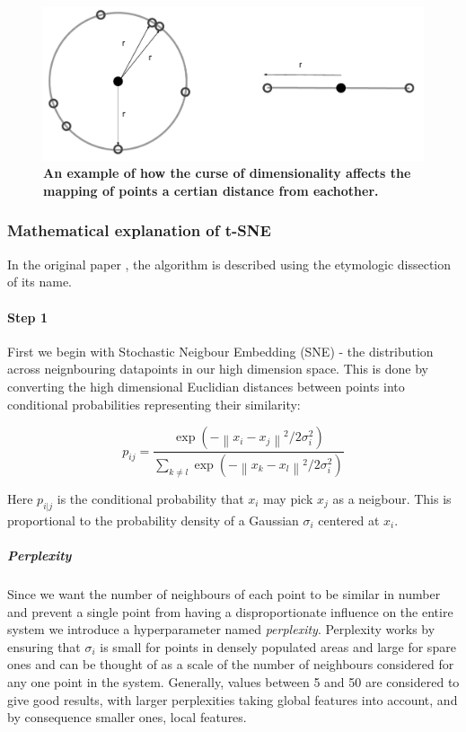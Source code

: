 \begin{figure}[H]
  \centering
\includegraphics[width=.5\textwidth]{4fig/dimcurse.pdf}
\caption{\textbf{An example of how the curse of dimensionality affects the mapping of points a certian distance from eachother.} }\label{fig:dimcurse}
\end{figure}




\subsubsection{Mathematical explanation of t-SNE}\label{sec:mathtsne}

%

In the original paper \citep{tsne}, the algorithm is described using the etymologic dissection of its name.

\paragraph{Step 1}
First we begin with Stochastic Neigbour Embedding (SNE) - the distribution across neignbouring datapoints in our high dimension space. This is done by converting the high dimensional Euclidian distances between points into conditional probabilities representing their similarity:

\begin{equation}
p_{ij} = \frac{\exp(-\left \| x_i - x_j \right \|^2 / 2\sigma_i^2)}{\sum_{k \neq l} \exp(- \left \| x_k - x_l \right \|^2 / 2\sigma_i^2)}
\end{equation}

Here $p_{i|j}$ is the conditional probability that $x_i$ may pick $x_j$ as a neigbour. This is proportional to the probability density of a Gaussian $\sigma_i$ centered at $x_i$.

\subparagraph{Perplexity}
Since we want the number of neighbours of each point to be similar in number and prevent a single point from having a disproportionate influence on the entire system we introduce a hyperparameter named \emph{perplexity}. Perplexity works by ensuring that $\sigma_i$ is small for points in densely populated areas and large for spare ones and can be thought of as a scale of the number of neighbours considered for any one point in the system. Generally, values between 5 and 50 are considered to give good results, with larger perplexities taking global features into account, and by consequence smaller ones, local features.

